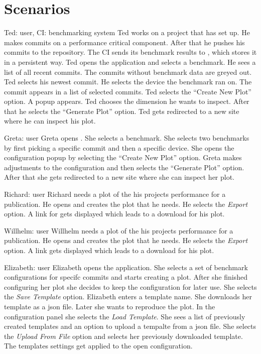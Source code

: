 \section{Scenarios}

{Ted: \Gls{user}, CI: \Gls{benchmarking system}}
{Ted works on a project that has \parkview{} set up. He makes commits on a performance critical component. After that he pushes his commits to the repository. The CI sends its benchmark results to \parkview{}, which stores it in a persistent way. Ted opens the application and selects a benchmark. He sees a list of all recent commits. The commits without benchmark data are greyed out. Ted selects his newest commit. He selects the device the benchmark ran on. The commit appears in a list of selected commits. Ted selects the \enquote{Create New Plot} option. A popup appears. Ted chooses the dimension he wants to inspect. After that he selects the \enquote{Generate Plot} option. Ted gets redirected to a new site where he can inspect his plot.} 

{Greta: \Gls{user}}
{Greta opens \parkview{}. She selects a benchmark. She selects two benchmarks by first picking a specific commit and then a specific device. She opens the configuration popup by selecting the \enquote{Create New Plot} option. Greta makes adjustments to the \gls{configuration} and then selects the \enquote{Generate Plot} option. After that she gets redirected to a new site where she can inspect her plot.}

{Richard: \Gls{user}}
{Richard needs a \gls{plot} of the his projects performance for a publication. He opens \parkview{} and creates the plot that he needs. He selects the \emph{Export} option. A link for gets displayed which leads to a download for his plot.}

{Willhelm: \Gls{user}}
{Willhelm needs a \gls{plot} of the his projects performance for a publication. He opens \parkview{} and creates the plot that he needs. He selects the \emph{Export} option. A link gets displayed which leads to a download for his plot.}

{Elizabeth: \Gls{user}}
{Elizabeth opens the application. She selects a set of \glspl{benchmark configuration} for specifc commits and starts creating a \gls{plot}. After she finished configuring her \gls{plot} she decides to keep the \gls{configuration} for later use. She selects the \emph{Save Template} option. Elizabeth enters a template name. She downloads her template as a \gls{json} file. Later she wants to reproduce the \gls{plot}. In the configuration panel she selects the \emph{Load Template}. She sees a list of previously created templates and an option to upload a tempalte from a \gls{json} file. She selects the \emph{Upload From File} option and selects her previously downloaded \gls{template}. The templates settings get applied to the open \gls{configuration}.}

